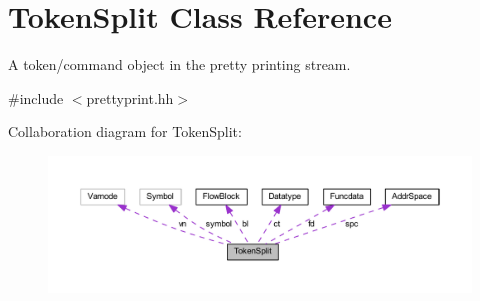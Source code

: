 \hypertarget{class_token_split}{}\section{Token\+Split Class Reference}
\label{class_token_split}


A token/command object in the pretty printing stream.  




{\ttfamily \#include $<$prettyprint.\+hh$>$}



Collaboration diagram for Token\+Split\+:
\nopagebreak
\begin{figure}[H]
\begin{center}
\leavevmode
\includegraphics[width=350pt]{class_token_split__coll__graph}
\end{center}
\end{figure}
